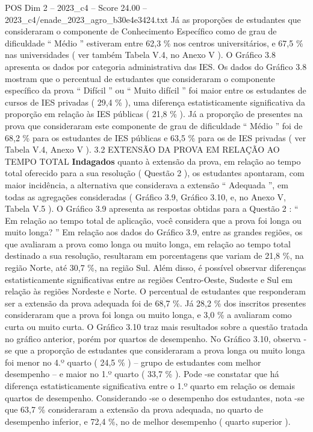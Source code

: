 \begin{textsample}{POS Dim 2 – 2023\_c4 – Score 24.00 – 2023\_c4/enade\_2023\_agro\_b30e4e3424.txt}
Já as proporções de estudantes que consideraram o componente de Conhecimento Específico como de grau de dificuldade “ Médio ” estiveram entre 62,3 \% nos centros universitários, e 67,5 \% nas universidades ( ver também Tabela V.4, no Anexo V ).
O Gráfico 3.8 apresenta os dados por categoria administrativa das IES.
Os dados do Gráfico 3.8 mostram que o percentual de estudantes que consideraram o componente específico da prova “ Difícil ” ou “ Muito difícil ” foi maior entre os estudantes de cursos de IES privadas ( 29,4 \% ), uma diferença estatisticamente significativa da proporção em relação às IES públicas ( 21,8 \% ).
Já a proporção de presentes na prova que consideraram este componente de grau de dificuldade “ Médio ” foi de 68,2 \% para os estudantes de IES públicas e 63,5 \% para os de IES privadas ( ver Tabela V.4, Anexo V ). 3.2 EXTENSÃO DA PROVA EM RELAÇÃO AO TEMPO TOTAL \textbf{Indagados} quanto à extensão da prova, em relação ao tempo total oferecido para a sua resolução ( Questão 2 ), os estudantes apontaram, com maior incidência, a alternativa que considerava a extensão “ Adequada ”, em todas as agregações consideradas ( Gráfico 3.9, Gráfico 3.10, e, no Anexo V, Tabela V.5 ).
O Gráfico 3.9 apresenta as respostas obtidas para a Questão 2 : “ Em relação ao tempo total de aplicação, você considera que a prova foi longa ou muito longa? ” Em relação aos dados do Gráfico 3.9, entre as grandes regiões, os que avaliaram a prova como longa ou muito longa, em relação ao tempo total destinado a sua resolução, resultaram em porcentagens que variam de 21,8 \%, na região Norte, até 30,7 \%, na região Sul.
Além disso, é possível observar diferenças estatisticamente significativas entre as regiões Centro-Oeste, Sudeste e Sul em relação às regiões Nordeste e Norte.
O percentual de estudantes que responderam ser a extensão da prova adequada foi de 68,7 \%.
Já 28,2 \% dos inscritos presentes consideraram que a prova foi longa ou muito longa, e 3,0 \% a avaliaram como curta ou muito curta.
O Gráfico 3.10 traz mais resultados sobre a questão tratada no gráfico anterior, porém por quartos de desempenho.
No Gráfico 3.10, observa -se que a proporção de estudantes que consideraram a prova longa ou muito longa foi menor no 4.º quarto ( 24,5 \% ) – grupo de estudantes com melhor desempenho – e maior no 1.º quarto ( 33,7 \% ).
Pode -se constatar que há diferença estatisticamente significativa entre o 1.º quarto em relação os demais quartos de desempenho.
Considerando -se o desempenho dos estudantes, nota -se que 63,7 \% consideraram a extensão da prova adequada, no quarto de desempenho inferior, e 72,4 \%, no de melhor desempenho ( quarto superior ).

\end{textsample}
